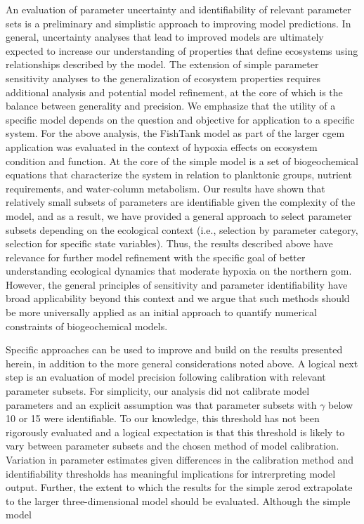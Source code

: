 \documentclass[letterpaper,12pt,oneside]{article}\usepackage[]{graphicx}\usepackage[]{color}
\begin{document}
An evaluation of parameter uncertainty and identifiability of relevant parameter sets is a preliminary and simplistic approach to improving model predictions.  In general, uncertainty analyses that lead to improved models are ultimately expected to increase our understanding of properties that define ecosystems using relationships described by the model.  The extension of simple parameter sensitivity analyses to the generalization of ecosystem properties requires additional analysis and potential model refinement, at the core of which is the balance between generality and precision. We emphasize that the utility of a specific model depends on the question and objective for application to a specific system.  For the above analysis, the FishTank model as part of the larger \ac{cgem} application was evaluated in the context of hypoxia effects on ecosystem condition and function.  At the core of the simple model is a set of biogeochemical equations that characterize the system in relation to planktonic groups, nutrient requirements, and water-column metabolism.  Our results have shown that relatively small subsets of parameters are identifiable given the complexity of the model, and as a result, we have provided a general approach to select parameter subsets depending on the ecological context (i.e., selection by parameter category, selection for specific state variables).  Thus, the results described above have relevance for further model refinement with the specific goal of better understanding ecological dynamics that moderate hypoxia on the northern \ac{gom}.  However, the general principles of sensitivity and parameter identifiability have broad applicability beyond this context and we argue that such methods should be more universally applied as an initial approach to quantify numerical constraints of biogeochemical models.  

Specific approaches can be used to improve and build on the results presented herein, in addition to the more general considerations noted above. A logical next step is an evaluation of model precision following calibration with relevant parameter subsets.  For simplicity, our analysis did not calibrate model parameters and an explicit assumption was that parameter subsets with $\gamma$ below 10 or 15 were identifiable.  To our knowledge, this threshold has not been rigorously evaluated and a logical expectation is that this threshold is likely to vary between parameter subsets and the chosen method of model calibration.  Variation in parameter estimates given differences in the calibration method and identifiability thresholds has meaningful implications for intrerpreting model output.  Further, the extent to which the results for the simple \ac{zerod} extrapolate to the larger three-dimensional model should be evaluated.  Although the simple model   
\end{document}

